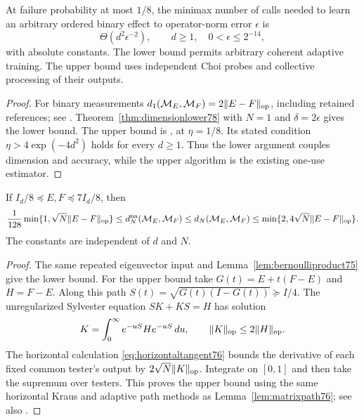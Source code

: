 \begin{corollary}
\label{cor:binaryoperatorlearning78}
At failure probability at most $1/8$, the minimax number of calls
needed to learn an arbitrary ordered binary effect to operator-norm
error $\epsilon$ is
\[
 \Theta(d^2\epsilon^{-2}),
 \qquad d\ge1,\quad0<\epsilon\le2^{-14},
\]
with absolute constants.  The lower bound permits arbitrary
coherent adaptive training.  The upper bound uses independent
Choi probes and collective processing of their outputs.
\end{corollary}
\begin{proof}
For binary measurements $d_1(\mathcal M_E,\mathcal M_F)
=2\|E-F\|_{\rm op}$, including retained references; see
\cite[Lemmas~III.7--III.8]{MB67}.
Theorem~\ref{thm:dimensionlower78} with $N=1$ and
$\delta=2\epsilon$ gives the lower bound.  The upper bound is
\cite[Corollary~III.9]{MB67}, at $\eta=1/8$.
Its stated condition $\eta>4\exp(-4d^2)$ holds for every $d\ge1$.
Thus the lower argument couples dimension and accuracy, while the
upper algorithm is the existing one-use estimator.
\end{proof}

\begin{lemma}
\label{lem:interiormetric78}
If $I_d/8\preceq E,F\preceq7I_d/8$, then
\begin{equation}\label{eq:interiormetric78}
 \frac1{128}\min\{1,\sqrt N\|E-F\|_{\rm op}\}
 \le d_N^{\rm na}(\mathcal M_E,\mathcal M_F)
 \le d_N(\mathcal M_E,\mathcal M_F)
 \le\min\{2,4\sqrt N\|E-F\|_{\rm op}\}.
\end{equation}
The constants are independent of $d$ and $N$.
\end{lemma}
\begin{proof}
The same repeated eigenvector input and
Lemma~\ref{lem:bernoulliproduct75} give the lower bound.
For the upper bound take $G(t)=E+t(F-E)$ and $H=F-E$.
Along this path $S(t)=\sqrt{G(t)(I-G(t))}\succeq I/4$.
The unregularized Sylvester equation $SK+KS=H$ has solution
\[
 K=\int_0^\infty e^{-uS}He^{-uS}\,du,
 \qquad\|K\|_{\rm op}\le2\|H\|_{\rm op}.
\]
The horizontal calculation \eqref{eq:horizontaltangent76} bounds
the derivative of each fixed common tester's output by
$2\sqrt N\|K\|_{\rm op}$.  Integrate on $[0,1]$ and then take
the supremum over testers.  This proves the upper bound using the
same horizontal Kraus and adaptive path methods as
Lemma~\ref{lem:matrixpath76}; see also
\cite{FI76,DM76,KGAD76,SD76}.
\end{proof}

